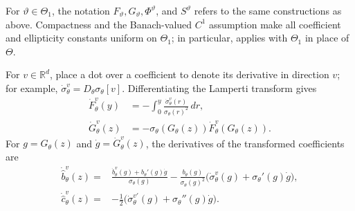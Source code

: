\documentclass[11pt,reqno]{amsart}
\theoremstyle{plain}
\theoremstyle{definition}
\newcommand{\R}{\mathbb R}
\newcommand{\dd}{\,d}
\begin{document}
For \(\vartheta\in\Theta_1\), the notation
\(F_\vartheta,G_\vartheta,\Phi^\vartheta\), and \(S^\vartheta\) refers to
the same constructions as above.  Compactness and the Banach-valued
\(C^1\) assumption make all coefficient and ellipticity constants uniform
on \(\Theta_1\); in particular,  applies with
\(\Theta_1\) in place of \(\Theta\).

For \(v\in\R^d\), place a dot over a coefficient to denote its derivative
in direction \(v\); for example,
\(\dot\sigma_\theta^v=D_\theta\sigma_\theta[v]\).  Differentiating the
Lamperti transform gives
\begin{align}
  \dot F_\theta^v(y)
  &=-\int_0^y
    \frac{\dot\sigma_\theta^v(r)}{\sigma_\theta(r)^2}\dd r,
  \label{eq:parametric-F-derivative}\\
  \dot G_\theta^v(z)
  &=-\sigma_\theta(G_\theta(z))
    \dot F_\theta^v(G_\theta(z)).
  \label{eq:parametric-G-derivative}
\end{align}
For \(g=G_\theta(z)\) and \(\dot g=\dot G_\theta^v(z)\), the derivatives of
the transformed coefficients are
\begin{align}
  \dot{\widehat b}_\theta^v(z)
  ={}&
  \frac{\dot b_\theta^v(g)+b_\theta'(g)\dot g}{\sigma_\theta(g)}
  -\frac{b_\theta(g)}{\sigma_\theta(g)^2}
  \bigl(\dot\sigma_\theta^v(g)+\sigma_\theta'(g)\dot g\bigr),
  \label{eq:parametric-bhat-derivative}\\
  \dot{\widehat c}_\theta^v(z)
  ={}&-\frac12
  \bigl(\dot\sigma_\theta^{v\prime}(g)+\sigma_\theta''(g)\dot g\bigr).
  \label{eq:parametric-chat-derivative}
\end{align}
\end{document}
